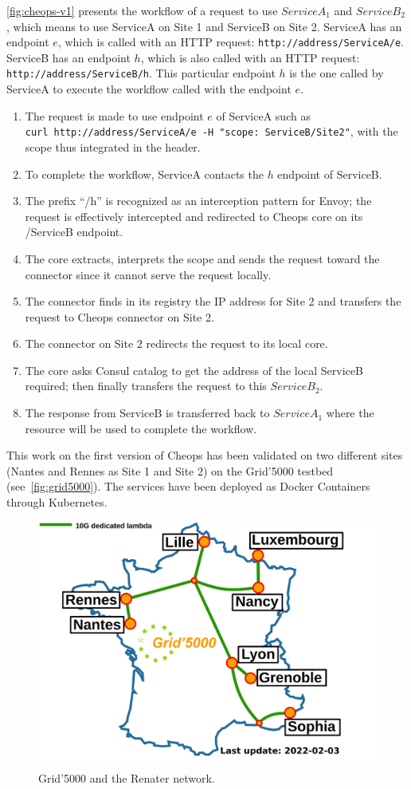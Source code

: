 \autoref{fig:cheops-v1} presents the workflow of a request to use
$ServiceA_1$ and $ServiceB_2$, which means to use ServiceA on Site 1
and ServiceB on Site 2.
%
ServiceA has an endpoint $e$, which is called with an HTTP request:
\verb|http://address/ServiceA/e|.
%
ServiceB has an endpoint $h$, which is also called with an HTTP request:
\verb|http://address/ServiceB/h|.
%
This particular endpoint $h$ is the one called by ServiceA to execute
the workflow called with the endpoint $e$.
\begin{enumerate}
\item The request is made to use endpoint $e$ of ServiceA such as \\
  \verb|curl http://address/ServiceA/e -H "scope: ServiceB/Site2"|,
  with the scope thus integrated in the header.
\item To complete the workflow, ServiceA contacts the $h$ endpoint of
  ServiceB.
\item The prefix ``/h'' is recognized as an interception pattern for
  Envoy; the request is effectively intercepted and redirected to
  Cheops core on its /ServiceB endpoint.
\item The core extracts, interprets the scope and sends the request
  toward the connector since it cannot serve the request locally.
\item The connector finds in its registry the IP address for Site 2
  and transfers the request to Cheops connector on Site 2.
\item The connector on Site 2 redirects the request to its local core.
\item The core asks Consul catalog to get the address of the local
  ServiceB required; then finally transfers the request to this
  $ServiceB_2$.
\item The response from ServiceB is transferred back to $ServiceA_1$
  where the resource will be used to complete the workflow.
\end{enumerate}

This work on the first version of Cheops has been validated on two
different sites (Nantes and Rennes as Site 1 and Site 2) on the
Grid'5000 testbed~\cite{grid5000} (see~\autoref{fig:grid5000}).
%
The services have been deployed as Docker Containers through
Kubernetes.


\begin{figure}
  \centering
  \includegraphics[width=.6\linewidth]{figs/png/Renater5-g5k.png}
  \caption{Grid'5000 and the Renater network.}
  \label{fig:grid5000}
\end{figure}

